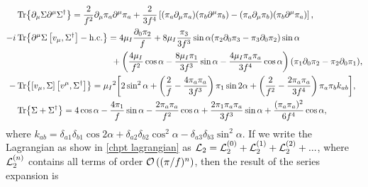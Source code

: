\begin{align*}
    & \Tr{\partial_\mu \Sigma \partial^\mu \Sigma^\dagger}
    = \frac{2}{f^2} \partial_\mu \pi_a \partial^\mu \pi_a
    + \frac{2}{3f^4}
    \left[
        (\pi_a\partial_\mu \pi_a)(\pi_b\partial^\mu \pi_b)
        -        
        (\pi_a\partial_\mu \pi_b)(\pi_b\partial^\mu \pi_a)
    \right], \\
    -i  &\Tr{\partial^\mu\Sigma\com{v_\mu}{\Sigma^\dagger} - \hc}
    =
    4 \mu_I \frac{\partial_0\pi_2}{f}
    + 8 \mu_I \frac{\pi_3}{3f^3}\sin{\alpha}(
        \pi_2 \partial_0 \pi_3 - \pi_3 \partial_0 \pi_2
        ) \sin{\alpha}
    \\ & \quad \quad \quad \quad \quad \quad \quad \quad \quad \quad \quad
    +
    \left(
        \frac{4\mu_I}{f^2} \cos{\alpha}
        - \frac{8 \mu_I\pi_1}{3f^3} \sin{\alpha}
        - \frac{4 \mu_I \pi_a \pi_a} {3f^4}\cos{\alpha} 
    \right) 
    (\pi_1\partial_0 \pi_2 - \pi_2 \partial_0 \pi_1), \\
    - & \Tr{\com{v_\mu}{\Sigma}\com{v^\mu}{\Sigma^\dagger}}
    = \mu_I{}^2
    \bigg[
        2 \sin^2{\alpha}
        +
        \left(
            \frac{2}{f} 
            - \frac{4\pi_a \pi_a}{3 f^3} 
        \right)
        \pi_1  \sin{2\alpha}
        + \left(
            \frac{2}{f^2}
            - \frac{2 \pi_a \pi_a}{3 f^4} 
        \right)
        \pi_a \pi_b k_{ab}
    \bigg], 
    \\
    & \Tr{\Sigma + \Sigma^\dagger}
    = 4 \cos{\alpha} 
    - \frac{4 \pi_1}{f} \sin{\alpha} 
    - \frac{2 \pi_a \pi_a}{f^2} \cos{\alpha}
    + \frac{2 \pi_1 \pi_a \pi_a}{3 f^3} \sin{\alpha}
    + \frac{(\pi_a \pi_a)^2}{6 f^4}\cos{\alpha}, 
    \end{align*}
where $k_{ab} =\delta_{a1} \delta_{b1} \cos{2\alpha}  + \delta_{a2}\delta_{b2}\cos^2{\alpha} - \delta_{a3}\delta_{b3} \sin^2{\alpha}$.
If we write the Lagrangian as show in \autoref{chpt lagrangian} as $\Ell_2 = \Ell_2^{(0)} + \Ell_2^{(1)} + \Ell_2^{(2)} +...$, where $\Ell_2^{(n)}$ contains all terms of order $\Oh[n]{(\pi/f)}$, then the result of the series expansion is

